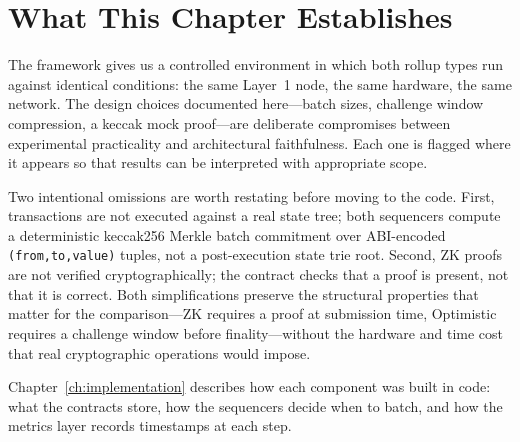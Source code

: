 \section{What This Chapter Establishes}

The framework gives us a controlled environment in which both rollup types run against identical conditions: the same Layer~1 node, the same hardware, the same network. The design choices documented here---batch sizes, challenge window compression, a keccak mock proof---are deliberate compromises between experimental practicality and architectural faithfulness. Each one is flagged where it appears so that results can be interpreted with appropriate scope.

Two intentional omissions are worth restating before moving to the code. First, transactions are not executed against a real state tree; both sequencers compute a deterministic keccak256 Merkle batch commitment over ABI-encoded \texttt{(from,to,value)} tuples, not a post-execution state trie root. Second, ZK proofs are not verified cryptographically; the contract checks that a proof is present, not that it is correct. Both simplifications preserve the structural properties that matter for the comparison---ZK requires a proof at submission time, Optimistic requires a challenge window before finality---without the hardware and time cost that real cryptographic operations would impose.

Chapter~\ref{ch:implementation} describes how each component was built in code: what the contracts store, how the sequencers decide when to batch, and how the metrics layer records timestamps at each step.
